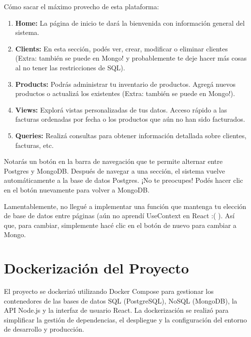 \documentclass[a4paper,12pt]{article}
\begin{document}
	Cómo sacar el máximo provecho de esta plataforma:
	
	\begin{enumerate}
		
		\item \textbf{Home:} La página de inicio te dará la bienvenida con información general del sistema.
		
		\item \textbf{Clients:} En esta sección, podés ver, crear, modificar o eliminar clientes (Extra: también se puede en Mongo! y probablemente te deje hacer más cosas al no tener las restricciones de SQL).
		
		\item \textbf{Products:} Podrás administrar tu inventario de productos. Agregá nuevos productos o actualizá los existentes (Extra: también se puede en Mongo!).
		
		\item \textbf{Views:} Explorá vistas personalizadas de tus datos. Acceso rápido a las facturas ordenadas por fecha o los productos que aún no han sido facturados.
		
		\item \textbf{Queries:} Realizá consultas para obtener información detallada sobre clientes, facturas, etc.
		
	\end{enumerate}
	
	Notarás un botón en la barra de navegación que te permite alternar entre Postgres y MongoDB. Después de navegar a una sección, el sistema vuelve automáticamente a la base de datos Postgres. ¡No te preocupes! Podés hacer clic en el botón nuevamente para volver a MongoDB.
	
	\bigskip
	
	Lamentablemente, no llegué a implementar una función que mantenga tu elección de base de datos entre páginas (aún no aprendí UseContext en React :( ). Así que, para cambiar, simplemente hacé clic en el botón de nuevo para cambiar a Mongo.
	
	
	\newpage
	
	\section{Dockerización del Proyecto}
	
	El proyecto se dockerizó utilizando Docker Compose para gestionar los contenedores de las bases de datos SQL (PostgreSQL), NoSQL (MongoDB), la API Node.js y la interfaz de usuario React. La dockerización se realizó para simplificar la gestión de dependencias, el despliegue y la configuración del entorno de desarrollo y producción.
	
\end{document}
